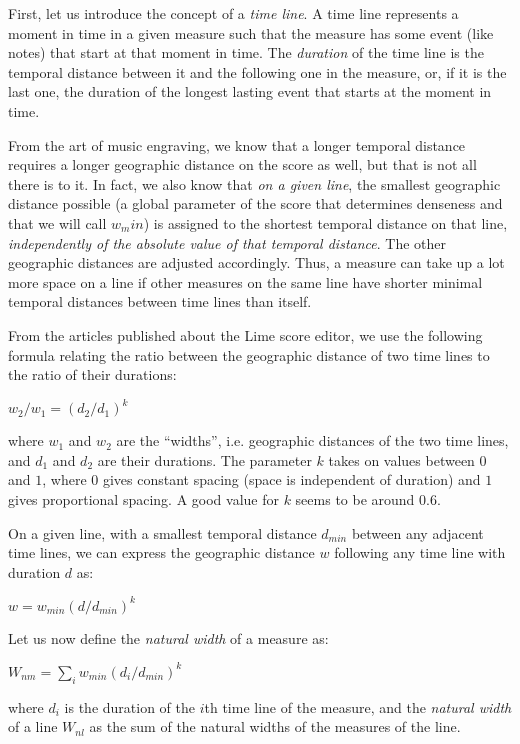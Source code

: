 \documentclass[11pt]{book}
\begin{document}
First, let us introduce the concept of a \emph{time line}. A time line represents a moment in time in a given measure such
that the measure has some event (like notes) that start at that moment
in time.  The \emph{duration} of the
time line is the temporal distance between it and the following one in
the measure, or, if it is the last one, the duration of the longest
lasting event that starts at the moment in time. 

From the art of music engraving, we know that a longer temporal
distance requires a longer geographic distance on the score as well,
but that is not all there is to it.  In fact, we also know that
\emph{on a given line}, the smallest geographic distance possible (a
global parameter of the score that determines denseness and that we
will call $w_min$) is assigned to the shortest temporal distance on
that line, \emph{independently of the absolute value of that temporal
distance}. The other geographic distances are adjusted accordingly.
Thus, a measure can take up a lot more space on a line if other
measures on the same line have shorter minimal temporal distances
between time lines than itself.

From the articles published about the Lime score editor, we use the
following formula relating the ratio between the geographic distance
of two time lines to the ratio of their durations:

$w_2 / w_1 = {(d_2 / d_1)}^k$

where $w_1$ and $w_2$ are the ``widths'', i.e. geographic distances of
the two time lines, and $d_1$ and $d_2$ are their durations. The
parameter $k$ takes on values between $0$ and $1$, where $0$ gives
constant spacing (space is independent of duration) and $1$ gives
proportional spacing.  A good value for $k$ seems to be around $0.6$. 

On a given line, with a smallest temporal distance $d_{min}$ between
any adjacent time lines, we can express the geographic distance
$w$ following any time line with duration $d$ as:

$w = w_{min} {(d / d_{min})}^k$

Let us now define the \emph{natural width} of a measure as:

$W_{nm} = \sum_i w_{min} {(d_i / d_{min})}^k$

where $d_i$ is the duration of the $i$th time line of the measure, and
the \emph{natural width} of a line $W_{nl}$ as the sum of the natural
widths of the measures of the line.  
\end{document}
